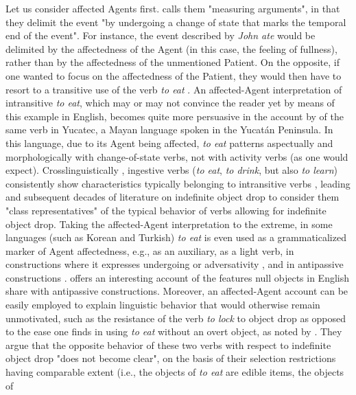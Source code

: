 Let us consider affected Agents first. \textcite[158]{tenny1994aspectual} calls them "measuring arguments", in that they delimit the event "by undergoing a change of state that marks the temporal end of the event". For instance, the event described by \textit{John ate} would be delimited by the affectedness of the Agent (in this case, the feeling of fullness), rather than by the affectedness of the unmentioned Patient. On the opposite, if one wanted to focus on the affectedness of the Patient, they would then have to resort to a transitive use of the verb \textit{to eat} \parencite[80]{Naess2007}. An affected-Agent interpretation of intransitive \textit{to eat}, which may or may not convince the reader yet by means of this example in English, becomes quite more persuasive in the account by \textcite[61-63]{Naess2007} of the same verb in Yucatec, a Mayan language spoken in the Yucatán Peninsula. In this language, due to its Agent being affected, \textit{to eat} patterns aspectually and morphologically with change-of-state verbs, not with activity verbs (as one would expect). Crosslinguistically \parencite[126]{Naess2007}, ingestive verbs (\textit{to eat}, \textit{to drink}, but also \textit{to learn}) consistently show characteristics typically belonging to intransitive verbs \parencite{Amberber2009, Amberber1996}, leading \textcite{marantz1981nature} and subsequent decades of literature on indefinite object drop to consider them "class representatives" of the typical behavior of verbs allowing for indefinite object drop. Taking the affected-Agent interpretation to the extreme, in some languages (such as Korean and Turkish) \textit{to eat} is even used as a grammaticalized marker of Agent affectedness, e.g., as an auxiliary, as a light verb, in constructions where it expresses undergoing or adversativity \parencite[75]{Naess2007}, and in antipassive constructions \parencite[414]{Naess2011}.  \textcite{Nicolas2019} offers an interesting account of the features null objects in English share with antipassive constructions. Moreover, an affected-Agent account can be easily employed to explain linguistic behavior that would otherwise remain unmotivated, such as the resistance of the verb \textit{to lock} to object drop as opposed to the ease one finds in using \textit{to eat} without an overt object, as noted by \textcite[30]{PethoKardos2006}. They argue that the opposite behavior of these two verbs with respect to indefinite object drop "does not become clear", on the basis of their selection restrictions having comparable extent (i.e., the objects of \textit{to eat} are edible items, the objects of 